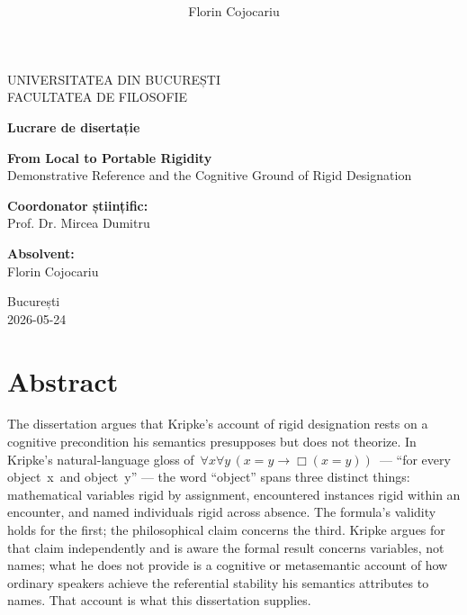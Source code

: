 \documentclass[11pt]{article}
\title{%
}
\author{Florin Cojocariu}
\date{}
\begin{document}
\begin{center}
\vspace*{0.5cm}
{\large UNIVERSITATEA DIN BUCUREȘTI}\\[0.3em]
{\large FACULTATEA DE FILOSOFIE}

\vfill

{\large\bfseries Lucrare de disertație}

\vspace{2em}

{\LARGE\bfseries From Local to Portable Rigidity}\\[1em]
{\Large Demonstrative Reference and the Cognitive Ground of Rigid Designation}

\vfill
\end{center}
\noindent
\begin{minipage}[t]{0.45\textwidth}
\raggedright
\textbf{Coordonator științific:}\\
Prof. Dr. Mircea Dumitru
\end{minipage}%
\hfill
\begin{minipage}[t]{0.45\textwidth}
\raggedleft
\textbf{Absolvent:}\\
Florin Cojocariu
\end{minipage}
\vspace{1.5cm}
\begin{center}
{\large București}\\[0.3em]
{\large 2026-05-24}
\end{center}
\clearpage

\section*{Abstract}\label{abstract}

The dissertation argues that Kripke's account of rigid designation rests on a cognitive precondition his semantics presupposes but does not theorize. In Kripke's natural-language gloss of~\(\forall x \forall y\,(x = y \rightarrow \Box(x = y))\)~--- ``for every object~x~and object~y'' --- the word ``object'' spans three distinct things: mathematical variables rigid by assignment, encountered instances rigid within an encounter, and named individuals rigid across absence. The formula's validity holds for the first; the philosophical claim concerns the third. Kripke argues for that claim independently and is aware the formal result concerns variables, not names; what he does not provide is a cognitive or metasemantic account of how ordinary speakers achieve the referential stability his semantics attributes to names. That account is what this dissertation supplies.
\end{document}
